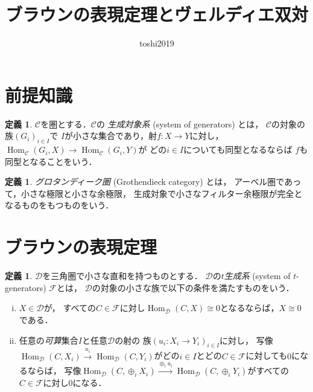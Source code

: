 \documentclass[uplatex,dvipdfmx,a4paper,10pt,draft]{jsarticle}
\title{ブラウンの表現定理とヴェルディエ双対}
\author{toshi2019}
\theoremstyle{definition}
\newcommand{\mcal}{\mathcal}
\newcommand{\Hom}{\mathop{\mathrm{Hom}}\nolimits} %
\numberwithin{equation}{section}
\newcommand{\cat}{\mathscr{C}}
\newcommand{\cD}{\mcal{D}}
\newcommand{\cF}{\mcal{F}}
\theoremstyle{mystyle}
\newtheorem{DFN}[AXM]{定義}
\begin{document}
\maketitle

\section{前提知識}

\begin{DFN}
    \(\cat\)を圏とする．\(\cat\)の
    \emph{生成対象系} (system of generators) とは，
    \(\cat\)の対象の族\(\left(G_i\right)_{i\in I}\)で
    \(I\)が小さな集合であり，射\(f\colon X\to Y\)に対し，
    \(\Hom_{\cat}(G_i,X)\to\Hom_{\cat}(G_i,Y)\)が
    どの\(i\in I\)についても同型となるならば
    \(f\)も同型となることをいう．
\end{DFN}


\begin{DFN}
    \emph{グロタンディーク圏} (Grothendieck category) とは，
    アーベル圏であって，小さな極限と小さな余極限，
    生成対象で小さなフィルター余極限が完全となるものをもつものをいう．
\end{DFN}

\section{ブラウンの表現定理}
\begin{DFN}
    \(\cD\)を三角圏で小さな直和を持つものとする．
    \(\cD\)の\emph{\(t\)生成系} (system of 
    \(t\)-generators) \(\cF\)とは，
    \(\cD\)の対象の小さな族で以下の条件を満たすものをいう．
    \begin{enumerate}[(i)]
        \item \(X\in\cD\)が，
        すべての\(C\in\cF\)に対し\(\Hom_{\cD}(C,X)\cong 0\)となるならば，\(X\cong 0\)である．
        \item 任意の\emph{可算}集合\(I\)と任意\(\cD\)の射の
        族\(\left(u_i\colon X_i\to Y_i\right)_{i\in I}\)に対し，
        写像\(
            \Hom_{\cD}(C,X_i)
            \overset{u_i}{\longrightarrow}
            \Hom_{\cD}(C,Y_i)
        \)がどの\(i\in I\)とどの\(C\in\cF\)に対しても\(0\)になるならば，
        写像\(
            \Hom_{\cD}(C,\oplus_i X_i)
            \overset{\oplus_i u_i}{\longrightarrow}
            \Hom_{\cD}(C,\oplus_i Y_i)
        \)がすべての\(C\in\cF\)に対し\(0\)になる．
    \end{enumerate}
\end{DFN}
\end{document}
